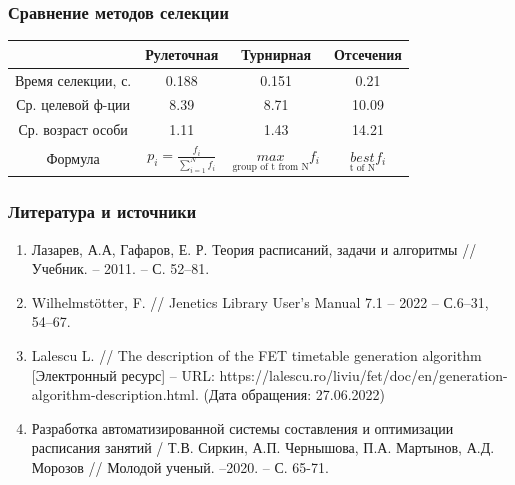 \documentclass[t, 12pt]{beamer}
\theoremstyle{definition}
\begin{document}
\begin{frame}[c]
\frametitle{Сравнение методов селекции}
\begin{table}
\centering
\begin{tabular}{||c|c|c|c||}
\hline
                    & Рулеточная    &   Турнирная   &   Отсечения \\
\hline
Время селекции, с.      & 0.188         &   0.151       &   0.21      \\
\hline
Ср. целевой ф-ции   & 8.39          &   8.71        &   10.09     \\
\hline
Ср. возраст особи   & 1.11          &   1.43        &   14.21     \\
\hline
Формула             & $p_i = \frac{f_i}{\sum^N_{i=1}f_i}$ 
                                    & $\underset{\text{group of t from N}}{max} f_i $
                                                    & $\underset{\text{t of N}}{best}f_i$ \\
\hline
\end{tabular}
\end{table}
\end{frame}
\begin{frame}
\frametitle{Литература и источники}
\begin{enumerate}
\item Лазарев, А.А, Гафаров, Е. Р. Теория расписаний, задачи и алгоритмы // Учебник. – 2011. – С. 52–81.
\item Wilhelmstötter, F. // Jenetics Library User’s Manual 7.1 – 2022 – С.6–31, 54–67.
\item Lalescu L. // The description of the FET timetable generation algorithm [Электронный ресурс] – URL: https://lalescu.ro/liviu/fet/doc/en/generation-algorithm-description.html. (Дата обращения: 27.06.2022)
\item Разработка автоматизированной системы составления и оптимизации расписания занятий / Т.В. Сиркин, А.П. Чернышова, П.А. Мартынов, А.Д. Морозов // Молодой ученый. –2020. – С. 65-71.

\end{enumerate}
\end{frame}
\end{document}
